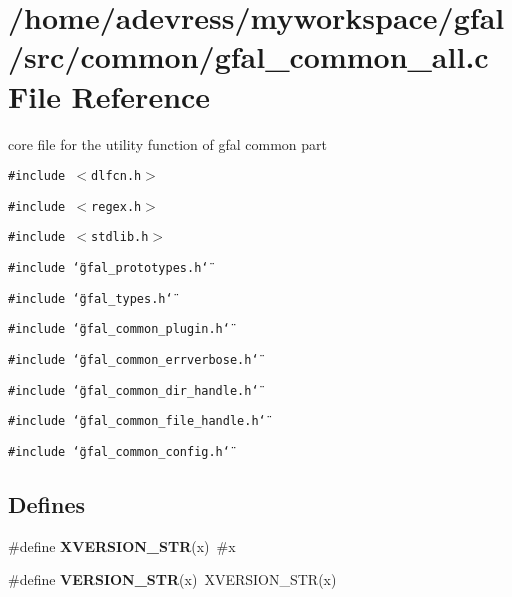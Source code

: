 \section{/home/adevress/myworkspace/gfal/src/common/gfal\_\-common\_\-all.c File Reference}
\label{gfal__common__all_8c}
core file for the utility function of gfal common part 

{\tt \#include $<$dlfcn.h$>$}\par
{\tt \#include $<$regex.h$>$}\par
{\tt \#include $<$stdlib.h$>$}\par
{\tt \#include \char`\"{}gfal\_\-prototypes.h\char`\"{}}\par
{\tt \#include \char`\"{}gfal\_\-types.h\char`\"{}}\par
{\tt \#include \char`\"{}gfal\_\-common\_\-plugin.h\char`\"{}}\par
{\tt \#include \char`\"{}gfal\_\-common\_\-errverbose.h\char`\"{}}\par
{\tt \#include \char`\"{}gfal\_\-common\_\-dir\_\-handle.h\char`\"{}}\par
{\tt \#include \char`\"{}gfal\_\-common\_\-file\_\-handle.h\char`\"{}}\par
{\tt \#include \char`\"{}gfal\_\-common\_\-config.h\char`\"{}}\par
\subsection*{Defines}
\begin{CompactItemize}
\item 
\#define \textbf{XVERSION\_\-STR}(x)~\#x\label{gfal__common__all_8c_09fc3dfb86b46f489c9bf89b784a285a}

\item 
\#define \textbf{VERSION\_\-STR}(x)~XVERSION\_\-STR(x)\label{gfal__common__all_8c_86cff2cb94b4b7cbf259ff9859c0dc50}

\end{CompactItemize}
